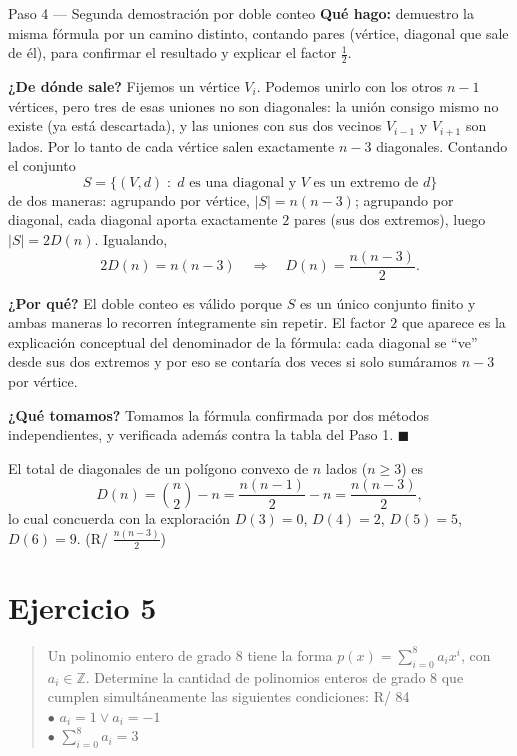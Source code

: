 \documentclass[11pt]{article}
\begin{document}
\begin{paso}{Paso 4 --- Segunda demostración por doble conteo}
\textbf{Qué hago:} demuestro la misma fórmula por un camino distinto, contando pares
(vértice, diagonal que sale de él), para confirmar el resultado y explicar el factor $\tfrac12$.

\textbf{¿De dónde sale?} Fijemos un vértice $V_i$. Podemos unirlo con los otros $n-1$ vértices, pero
tres de esas uniones no son diagonales: la unión consigo mismo no existe (ya está descartada), y las
uniones con sus dos vecinos $V_{i-1}$ y $V_{i+1}$ son lados. Por lo tanto de cada vértice salen
exactamente $n-3$ diagonales. Contando el conjunto
\[
S=\{(V,d)\;:\; d \text{ es una diagonal y } V \text{ es un extremo de } d\}
\]
de dos maneras: agrupando por vértice, $|S|=n(n-3)$; agrupando por diagonal, cada diagonal aporta
exactamente $2$ pares (sus dos extremos), luego $|S|=2D(n)$. Igualando,
\[
2D(n)=n(n-3)\quad\Longrightarrow\quad D(n)=\frac{n(n-3)}{2}.
\]

\textbf{¿Por qué?} El doble conteo es válido porque $S$ es un único conjunto finito y ambas maneras lo
recorren íntegramente sin repetir. El factor $2$ que aparece es la explicación conceptual del
denominador de la fórmula: cada diagonal se ``ve'' desde sus dos extremos y por eso se contaría dos
veces si solo sumáramos $n-3$ por vértice.

\textbf{¿Qué tomamos?} Tomamos la fórmula confirmada por dos métodos independientes, y verificada
además contra la tabla del Paso 1. $\blacksquare$
\end{paso}

\begin{resp}
El total de diagonales de un polígono convexo de $n$ lados ($n\ge 3$) es
\[
D(n)=\binom{n}{2}-n=\frac{n(n-1)}{2}-n=\frac{n(n-3)}{2},
\]
lo cual concuerda con la exploración $D(3)=0$, $D(4)=2$, $D(5)=5$, $D(6)=9$.
\hfill \Big(R/ $\tfrac{n(n-3)}{2}$\Big)
\end{resp}

\section*{Ejercicio 5}

\begin{quote}
Un polinomio entero de grado 8 tiene la forma $p(x)=\displaystyle\sum_{i=0}^{8} a_i x^i$, con
$a_i\in\mathbb{Z}$. Determine la cantidad de polinomios enteros de grado 8 que cumplen
simultáneamente las siguientes condiciones: \hfill R/ 84\\
$\bullet$ $a_i=1 \vee a_i=-1$\\
$\bullet$ $\displaystyle\sum_{i=0}^{8} a_i = 3$
\end{quote}
\end{document}
